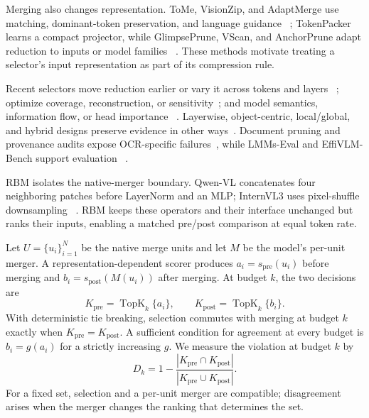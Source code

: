 \documentclass[smallabstract,smallcaptions]{dccpaper}
\begin{document}
Merging also changes representation. ToMe, VisionZip, and AdaptMerge use
matching, dominant-token preservation, and language guidance
~\cite{bolya2023tome,yang2024visionzip,islam2025adaptmerge}; TokenPacker learns
a compact projector, while GlimpsePrune, VScan, and AnchorPrune adapt reduction
to inputs or model families
~\cite{li2024tokenpacker,zeng2025glimpseprune,zhang2025vscan,
oh2026anchorprune}. These methods motivate treating a selector's input
representation as part of its compression rule.

Recent selectors move reduction earlier or vary it across tokens and layers
~\cite{gao2026quietprune,wang2026pixelprune,li2026transprune,
chen2026v2drop,sun2026hiloprune}; optimize coverage, reconstruction, or
sensitivity~\cite{ma2026apet,xu2026score,du2026coin,kim2026zooprune,
lee2026spare}; and model semantics, information flow, or head importance
~\cite{wang2026metacompress,song2026evocomp,sun2026ifprune,zhu2026hawk}.
Layerwise, object-centric, local/global, and hybrid designs preserve evidence in
other ways~\cite{wang2026informationhorizon,chen2026alvts,li2026crisp,
lei2026core,li2026aot,zhang2026hybrid}. Document pruning and provenance audits
expose OCR-specific failures~\cite{choi2026docprune,liu2026provenance}, while
LMMs-Eval and EffiVLM-Bench support evaluation
~\cite{zhang2024lmmseval,wang2025effivlmbench}.

RBM isolates the native-merger boundary. Qwen-VL concatenates four neighboring
patches before LayerNorm and an MLP; InternVL3 uses pixel-shuffle downsampling
~\cite{bai2025qwen3vl,bai2025qwen25vl,zhu2025internvl3}. RBM keeps these
operators and their interface unchanged but ranks their inputs, enabling a
matched pre/post comparison at equal token rate.



Let $U=\{u_i\}_{i=1}^{N}$ be the native merge units and let $M$ be the
model's per-unit merger. A representation-dependent scorer produces
$a_i=s_{\mathrm{pre}}(u_i)$ before merging and
$b_i=s_{\mathrm{post}}(M(u_i))$ after merging. At budget $k$, the two decisions
are
\begin{equation}
K_{\mathrm{pre}}=\operatorname{TopK}_{k}\{a_i\},\qquad
K_{\mathrm{post}}=\operatorname{TopK}_{k}\{b_i\}.
\label{eq:sets}
\end{equation}
With deterministic tie breaking, selection commutes with merging at budget
$k$ exactly when $K_{\mathrm{pre}}=K_{\mathrm{post}}$. A sufficient condition
for agreement at every budget is $b_i=g(a_i)$ for a strictly increasing $g$.
We measure the violation at budget $k$ by
\begin{equation}
D_k=1-\frac{|K_{\mathrm{pre}}\cap K_{\mathrm{post}}|}
{|K_{\mathrm{pre}}\cup K_{\mathrm{post}}|}.
\label{eq:disagreement}
\end{equation}
For a fixed set, selection and a per-unit merger are compatible; disagreement
arises when the merger changes the ranking that determines the set.
\end{document}

